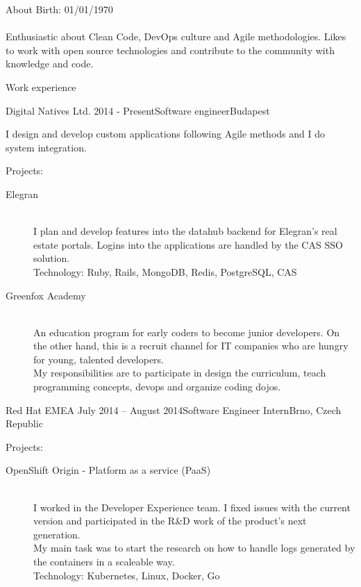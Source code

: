 \documentclass{resume} %
\begin{document}
\begin{rSection}{About}
 Birth: 01/01/1970 \\
 \\
 Enthusiastic about Clean Code, DevOps culture and Agile methodologies. Likes to work
 with open source technologies and contribute to the community with knowledge and code.
\end{rSection}


\begin{rSection}{Work experience}

\begin{rSubsection}{Digital Natives Ltd.}
{2014 - Present}{Software engineer}{Budapest}
\item I design and develop custom applications following Agile methods and I do system integration.
\item Projects:
	\begin{description}
		\item[Elegran] \hfill \\
		I plan and develop features into the datahub backend for Elegran’s real estate portals.
		Logins into the applications are handled by the CAS SSO solution. \\
		Technology: Ruby, Rails, MongoDB, Redis, PostgreSQL, CAS
	\end{description}
	\begin{description}
		\item[Greenfox Academy] \hfill \\
		An education program for early coders to become junior developers.
		On the other hand, this is a recruit channel for IT companies who are hungry
		for young, talented developers. \\
		My responsibilities are to participate in design the curriculum, teach
		programming concepts, devops and organize coding dojos.
	\end{description}
\end{rSubsection}

\begin{rSubsection}{Red Hat EMEA}
{July 2014 – August 2014}{Software Engineer Intern}{Brno, Czech Republic}
\item Projects:
	\begin{description}
		\item[OpenShift Origin - Platform as a service (PaaS)] \hfill \\
		I worked in the Developer Experience team. I fixed issues with the current version
		and participated in the R\&D work of the product's next generation.\\
		My main task was to start the research on how to handle logs generated by the containers
		in a scaleable way. \\
		Technology: Kubernetes, Linux, Docker, Go
	\end{description}
\end{rSubsection}


\end{rSection}
\end{document}
